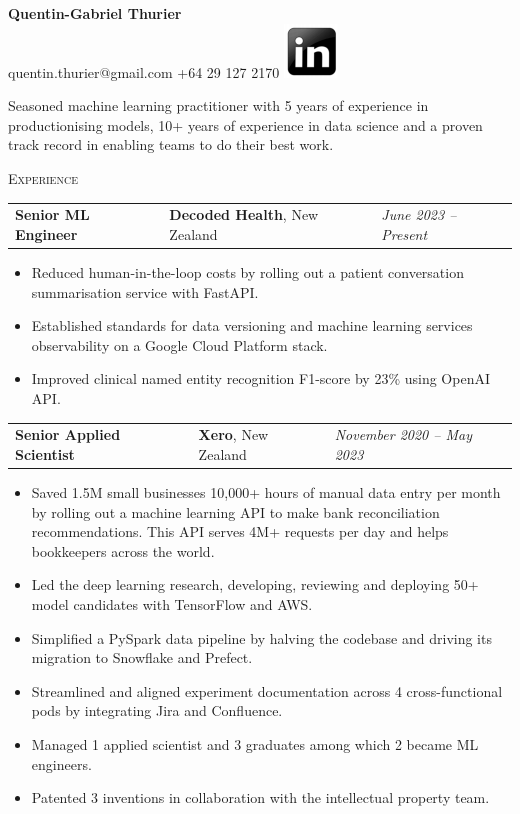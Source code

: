 \documentclass[letterpaper,11pt]{article}
\renewcommand{\section}[1]{{\vspace{0.3cm}}{\scshape\color{blue}#1}{\color{blue}\hrulefill}{\vspace{0.2cm}}}
\newcommand{\resumeItemListStart}{\begin{itemize}[label=$\circ$, topsep=0.1cm, parsep=0cm, partopsep=0cm, itemsep=0.1cm, leftmargin=0.4cm]}
\newcommand{\resumeItem}[1]{\item\small{#1}}
\newcommand{\resumeJustifiedItem}[1]{\item\begin{justify}\small{#1}\end{justify}}
\newcommand{\resumeItemListEnd}{\end{itemize}}
\newcommand{\job}[4]{
    \begin{tabular}{p{7cm}p{6cm}p{5cm}}
      \hspace{-0.7em} \textbf{#1} & \textbf{\small{#2}}\scriptsize{, #3} & \hfill \textit{\small{#4}}
    \end{tabular}
}
\begin{document}
 

\begin{center}
  \textbf{\Large Quentin-Gabriel Thurier} \\
  \small{quentin.thurier@gmail.com} \textbar{}
  \small{+64 29 127 2170} \textbar{}
  \href{https://www.linkedin.com/in/quentin-gabriel-thurier-36586021/}{\includegraphics[scale=0.6,valign=b]{linkedin}} %
\end{center}

\begin{justify}
  Seasoned machine learning practitioner with 5 years of experience in productionising models, 10+ years of experience in data science and a proven track record in enabling teams to do their best work.
\end{justify}

\vspace{-0.2cm}

\section{Experience}

\job {Senior ML Engineer}{Decoded Health}{New Zealand}{June 2023 -- Present}
\resumeItemListStart
\resumeItem {Reduced human-in-the-loop costs by rolling out a patient conversation summarisation service with FastAPI.}
\resumeItem {Established standards for data versioning and machine learning services observability on a Google Cloud Platform stack.}
\resumeItem {Improved clinical named entity recognition F1-score by 23\% using OpenAI API.}
\resumeItemListEnd \vspace{0.2cm}

\job {Senior Applied Scientist}{Xero}{New Zealand}{November 2020 -- May 2023}
\resumeItemListStart
\resumeJustifiedItem {Saved 1.5M small businesses 10,000+ hours of manual data entry per month by rolling out a machine learning API to make bank reconciliation recommendations. This API serves 4M+ requests per day and helps bookkeepers across the world.}
\resumeJustifiedItem {Led the deep learning research, developing, reviewing and deploying 50+ model candidates with TensorFlow and AWS.}
\resumeItem {Simplified a PySpark data pipeline by halving the codebase and driving its migration to Snowflake and Prefect.}
\resumeItem {Streamlined and aligned experiment documentation across 4 cross-functional pods by integrating Jira and Confluence.}
\resumeItem {Managed 1 applied scientist and 3 graduates among which 2 became ML engineers.}
\resumeItem {Patented 3 inventions in collaboration with the intellectual property team.}
\resumeItemListEnd \vspace{0.2cm}
\end{document}
